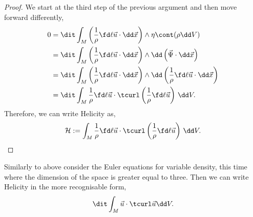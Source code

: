 \begin{proof}
  We start at the third step of the previous argument and then move forward differently,
  \begin{align*}
    0 &= \dit \int_M \left(\frac{1}{\rho}\fd \ell {\vec u} \cdot \dd \vec x\right) \wedge \eta \cont (\rho \dd V) \\
    &= \dit \int_M \left(\frac{1}{\rho}\fd \ell {\vec u} \cdot \dd \vec x\right) \wedge \dd\left( \vec\Psi \cdot \dd \vec x \right) \\
    &= \dit \int_M \left(\frac{1}{\rho}\fd \ell {\vec u} \cdot \dd \vec x\right) \wedge \dd \left( \frac{1}{\rho}\fd \ell {\vec u} \cdot \dd \vec x \right) \\
    &= \dit \int_M \frac{1}{\rho}\fd \ell {\vec u} \cdot \tcurl \left( \frac{1}{\rho}\fd \ell {\vec u} \right)\,\dd V.
  \end{align*}
  Therefore, we can write Helicity as,
  $$ \mathcal{H} := \int_M \frac{1}{\rho}\fd \ell {\vec u} \cdot \tcurl \left( \frac{1}{\rho}\fd \ell {\vec u} \right)\,\dd V. $$
\end{proof}
\noindent
Similarly to above consider the Euler equations for variable density, this time where the dimension of the space is greater equal to three. Then we can write Helicity in the more recognisable form,
$$ \dit \int_M \vec u \cdot \tcurl \vec u \dd V. $$


